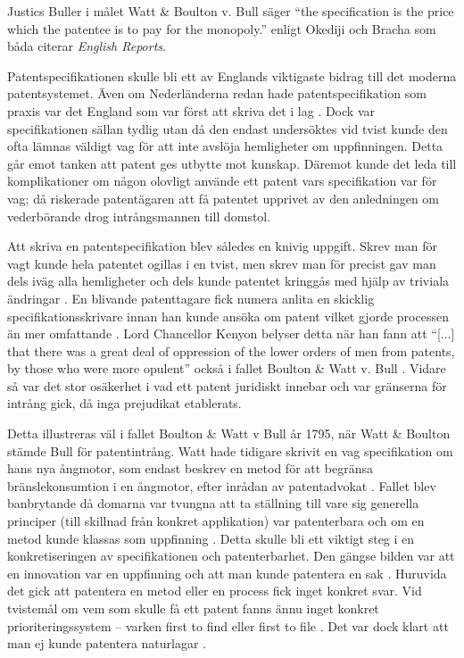 
Justics Buller i målet Watt \& Boulton v. Bull säger
``the specification is the price which 
the patentee is to pay for the monopoly.'' enligt Okediji \cite{oked} och Bracha\cite{bracha} som båda citerar \emph{English Reports}.

Patentspecifikationen skulle bli ett av Englands viktigaste bidrag till det
moderna patentsystemet. Även om
Nederländerna redan hade patentspecifikation som praxis var det England som var först att skriva det i
lag \cite{macleod}. Dock var specifikationen sällan tydlig utan då den endast undersöktes vid tvist
kunde den ofta lämnas väldigt vag för att inte avslöja hemligheter om uppfinningen. Detta går emot tanken
att patent ges utbytte mot kunskap. Däremot kunde det leda till komplikationer om någon olovligt använde ett
patent vars specifikation var för vag; då riskerade patentägaren att få patentet upprivet av den anledningen om vederbörande drog intrångsmannen till domstol.

Att skriva en patentspecifikation blev således en knivig uppgift. Skrev man för vagt kunde hela patentet
ogillas i en tvist, men skrev man för precist gav man dels iväg alla hemligheter och dels kunde patentet
kringgås med hjälp av triviala ändringar \cite{macleod}. En
blivande patenttagare fick numera anlita en skicklig specifikationsskrivare innan han kunde ansöka om
patent vilket gjorde processen än mer omfattande \cite{macleod}. Lord Chancellor Kenyon belyser detta när han fann att ``[...] that there was a great deal of 
oppression of the lower orders of men from patents, by those who were more 
opulent'' också i fallet Boulton \& Watt v. Bull \cite{macleod, robinson}.
Vidare så var det stor osäkerhet i vad ett patent juridiskt innebar och var gränserna för intrång gick, då inga prejudikat etablerats.

Detta illustreras väl i fallet Boulton \& Watt v Bull år 1795, när Watt \& Boulton stämde Bull för patentintrång. Watt hade tidigare skrivit en vag specifikation om hans nya ångmotor, som endast beskrev en metod för att begränsa bränslekonsumtion i en ångmotor, efter inrådan av patentadvokat \cite{bracha}. Fallet blev banbrytande då domarna var tvungna att ta ställning till vare sig generella principer (till skillnad från konkret applikation) var patenterbara och om en metod kunde klassas som uppfinning \cite{bracha}. Detta skulle bli ett viktigt steg i en konkretiseringen av specifikationen och patenterbarhet. Den gängse bilden var att en innovation var en uppfinning och att man kunde patentera en sak \cite{bracha}. Huruvida det gick att patentera en metod eller en process fick inget konkret svar. Vid tvistemål om vem som skulle få ett patent fanns ännu inget konkret prioriteringssystem -- varken first to find eller first to file \cite{bracha}. Det var dock klart att man ej kunde patentera naturlagar \cite{bracha}.

